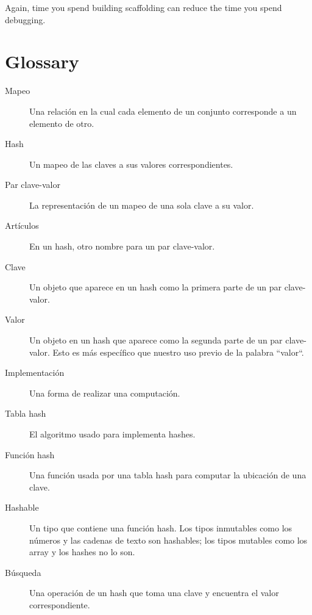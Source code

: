Again, time you spend building scaffolding can reduce
the time you spend debugging.


\section{Glossary}

\begin{description}

\item[Mapeo] Una relación en la cual cada elemento de un
conjunto corresponde a un elemento de otro.

\item[Hash] Un mapeo de las claves a sus valores correspondientes.

\item[Par clave-valor] La representación de un mapeo de una sola clave
a su valor.

\item[Artículos] En un hash, otro nombre para un par clave-valor.

\item[Clave] Un objeto que aparece en un hash como la primera parte
de un par clave-valor.

\item[Valor] Un objeto en un hash que aparece como la segunda parte de 
un par clave-valor. Esto es más específico que nuestro uso previo de
la palabra ``valor``.

\item[Implementación] Una forma de realizar una computación.

\item[Tabla hash] El algoritmo usado para implementa hashes.

\item[Función hash] Una función usada por una tabla hash para computar
la ubicación de una clave.

\item[Hashable] Un tipo que contiene una función hash. Los tipos inmutables
como los números y las cadenas de texto son hashables; los tipos
mutables como los array y los hashes no lo son.

\item[Búsqueda] Una operación de un hash que toma una clave y encuentra
el valor correspondiente.


\end{description}
